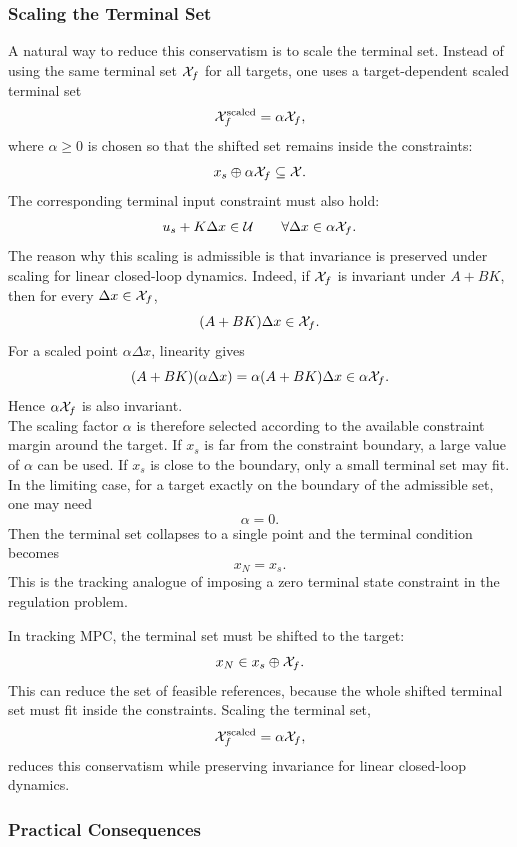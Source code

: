 \subsubsection{Scaling the Terminal Set}

A natural way to reduce this conservatism is to scale the terminal set. Instead of using the
same terminal set \(\mathcal{X}_f\) for all targets, one uses a target-dependent scaled terminal set
\[
    \mathcal{X}_f^{\mathrm{scaled}} = \alpha \mathcal{X}_f,
\]
where \(\alpha\ge0\) is chosen so that the shifted set remains inside the constraints:
\[
    x_s\oplus \alpha\mathcal{X}_f \subseteq \mathcal{X}.
\]
The corresponding terminal input constraint must also hold:
\[
    u_s + K\Delta x \in \mathcal{U}
    \qquad \forall \Delta x\in \alpha\mathcal{X}_f.
\]
The reason why this scaling is admissible is that invariance is preserved under scaling for
linear closed-loop dynamics. Indeed, if \(\mathcal{X}_f\) is invariant under \(A+BK\), then for every
\(\Delta x\in\mathcal{X}_f\),
\[
    (A+BK)\Delta x\in\mathcal{X}_f.
\]
For a scaled point \(\alpha\Delta x\), linearity gives
\[
    (A+BK)(\alpha\Delta x)
    =
    \alpha(A+BK)\Delta x
    \in
    \alpha\mathcal{X}_f.
\]
Hence \(\alpha\mathcal{X}_f\) is also invariant.\\
The scaling factor \(\alpha\) is therefore selected according to the available constraint margin
around the target. If \(x_s\) is far from the constraint boundary, a large value of \(\alpha\) can be
used. If \(x_s\) is close to the boundary, only a small terminal set may fit. In the limiting case,
for a target exactly on the boundary of the admissible set, one may need
\[
    \alpha=0.
\]
Then the terminal set collapses to a single point and the terminal condition becomes
\[
    x_N=x_s.
\]
This is the tracking analogue of imposing a zero terminal state constraint in the regulation
problem.

\begin{theorembox}
In tracking MPC, the terminal set must be shifted to the target:
\[
    x_N\in x_s\oplus\mathcal{X}_f.
\]
This can reduce the set of feasible references, because the whole shifted terminal set must fit
inside the constraints. Scaling the terminal set,
\[
    \mathcal{X}_f^{\mathrm{scaled}}=\alpha\mathcal{X}_f,
\]
reduces this conservatism while preserving invariance for linear closed-loop dynamics.
\end{theorembox}

\subsubsection{Practical Consequences}

